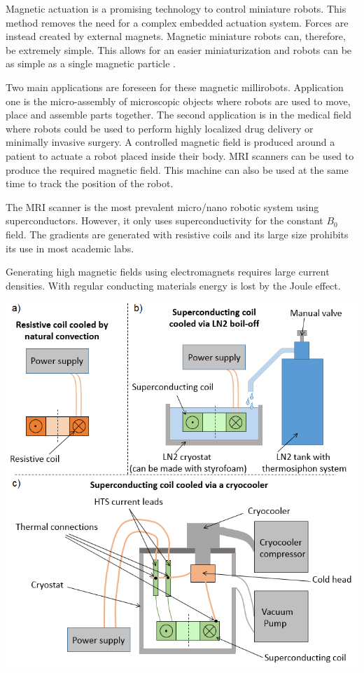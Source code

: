 \documentclass{ws-jmrr}
\begin{document}
\begin{multicols}{2}
Magnetic actuation is a promising technology to control miniature robots. This method removes the need for a complex embedded actuation system. Forces are instead created by external magnets. Magnetic miniature robots can, therefore, be extremely simple. This allows for an easier miniaturization and robots can be as simple as a single magnetic particle \cite{sitti2015biomedical}.\par
Two main applications are foreseen for these magnetic millirobots. Application one is the micro-assembly of microscopic objects where robots are used to move, place and assemble parts together. The second application is in the medical field where robots could be used to perform highly localized drug delivery or minimally invasive surgery. A controlled magnetic field is produced around a patient to actuate a robot placed inside their body. MRI scanners can be used to produce the required magnetic field. This machine can also be used at the same time to track the position of the robot.\par
The MRI scanner is the most prevalent micro/nano robotic system using superconductors. However, it only uses superconductivity for the constant $B_0$ field. The gradients are generated with resistive coils and its large size prohibits its use in most academic labs.\par
Generating high magnetic fields using electromagnets requires large current densities. With regular conducting materials energy is lost by the Joule effect.
\begin{figurehere}
\begin{center}
	\includegraphics[width=\linewidth]{fig_system_v2.png}

\end{center}
\end{figurehere}
\end{multicols}
\end{document}
